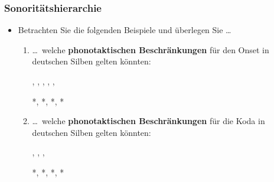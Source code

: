 \begin{frame}
\frametitle{Sonoritätshierarchie}

\begin{itemize}
	\item Betrachten Sie die folgenden Beispiele und überlegen Sie \dots
	
	\begin{enumerate}
		\item \dots\ welche \textbf{phonotaktischen Beschränkungen} für den Onset in deutschen Silben gelten könnten:

                  \ea
                  , \textipa{[pla:n]}, \textipa{[f\textscr E\c{c}]},
                  \textipa{[flo:]}, \textipa{[kni:]}, \textipa{[gna:d@]}
                  \z

                  \ea
                  *\textipa{[lbat]}, *\textipa{[\textscr to:k]}, *\textipa{[nki:l]}, *\textipa{[ngak]}
                  \z
                  
\pause
		\item \dots\ welche \textbf{phonotaktischen Beschränkungen} für die Koda in deutschen Silben gelten könnten:

                  \ea
                  \textipa{[kalt]}, \textipa{[ha5t]}, \textipa{[lant]}, 
                  \z

                  \ea
                  *\textipa{[katl]}, *, *\textipa{[latn]},
                  *
                  \z

	\end{enumerate}
	
\end{itemize}

\end{frame}



